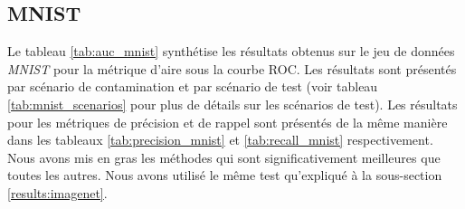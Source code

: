 \subsection{MNIST}

Le tableau \ref{tab:auc_mnist} synthétise les résultats obtenus sur le jeu de données \textit{MNIST} pour la métrique d'aire sous la courbe ROC. Les résultats sont présentés par scénario de contamination et par scénario de test (voir tableau \ref{tab:mnist_scenarios} pour plus de détails sur les scénarios de test). Les résultats pour les métriques de précision et de rappel sont présentés de la même manière dans les tableaux \ref{tab:precision_mnist} et \ref{tab:recall_mnist} respectivement. Nous avons mis en gras les méthodes qui sont significativement meilleures que toutes les autres. Nous avons utilisé le même test qu'expliqué à la sous-section \ref{results:imagenet}.

